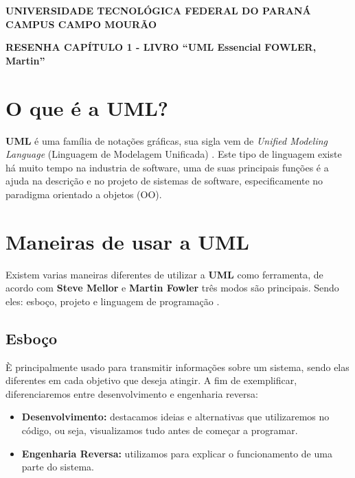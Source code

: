 \documentclass[a4paper, 12pt]{article}
\begin{document}
	
	\hspace{5cm}
	
	\begin{large}
		\begin{center}
			\textbf{UNIVERSIDADE TECNOLÓGICA FEDERAL DO PARANÁ}\newline
			\textbf{CAMPUS CAMPO MOURÃO}
		\end{center}
	\end{large}
	
	\hspace{20cm}
	
	\begin{center}
		\textbf{RESENHA CAPÍTULO 1 - LIVRO ``UML Essencial
		FOWLER, Martin''}
	\end{center}

	\hspace{10cm}
	
	\section{O que é a UML?}
	
	\onehalfspacing
	\textbf{UML} é uma família de notações gráficas, sua sigla vem de \textit{Unified Modeling Language} (Linguagem de Modelagem Unificada) \cite{umlEssencial}. Este tipo de linguagem existe há muito tempo na industria de software, uma de suas principais funções é a ajuda na descrição e no projeto de sistemas de software, especificamente no paradigma orientado a objetos (OO).
	
	\section{Maneiras de usar a UML}
	
	Existem varias maneiras diferentes de utilizar a \textbf{UML} como ferramenta, de acordo com \textbf{Steve Mellor} e \textbf{Martin Fowler} três modos são principais. Sendo eles: esboço, projeto e linguagem de programação \cite{umlEssencial}.

	
	\subsection{Esboço}
	
		È principalmente usado para transmitir informações sobre um sistema, sendo elas diferentes em cada objetivo que deseja atingir. A fim de exemplificar, diferenciaremos entre desenvolvimento e engenharia reversa:
		
		\begin{itemize}
			\item \textbf{Desenvolvimento:} destacamos ideias e alternativas que utilizaremos no código, ou seja, visualizamos tudo antes de começar a programar.
			
			\item \textbf{Engenharia Reversa:} utilizamos para explicar o funcionamento de uma parte do sistema.
		\end{itemize}
	
\end{document}
